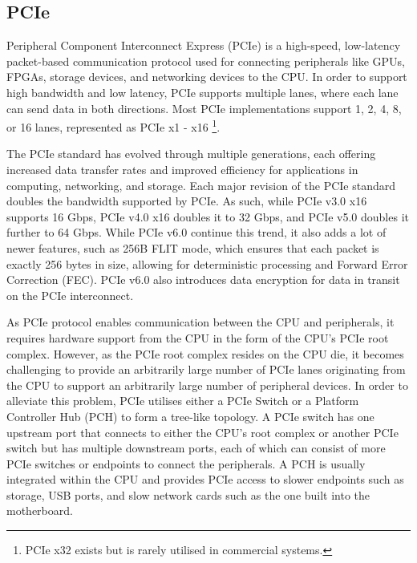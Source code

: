 \subsection{PCIe}
\label{subsec:interconnect-sc-background-pcie}

Peripheral Component Interconnect Express (PCIe) is a high-speed, low-latency packet-based communication protocol used for connecting peripherals like GPUs, FPGAs, storage devices, and networking devices to the CPU. 
In order to support high bandwidth and low latency, PCIe supports multiple lanes, where each lane can send data in both directions.
Most PCIe implementations support 1, 2, 4, 8, or 16 lanes, represented as PCIe x1 - x16
\footnote{PCIe x32 exists but is rarely utilised in commercial systems.}.

The PCIe standard has evolved through multiple generations, each offering increased data transfer rates and improved efficiency for applications in computing, networking, and storage.
Each major revision of the PCIe standard doubles the bandwidth supported by PCIe.
As such, while PCIe v3.0 x16 supports 16 Gbps, PCIe v4.0 x16 doubles it to 32 Gbps, and PCIe v5.0 doubles it further to 64 Gbps.
While PCIe v6.0 continue this trend, it also adds a lot of newer features, such as 256B FLIT mode, which ensures that each packet is exactly 256 bytes in size, allowing for deterministic processing and Forward Error Correction (FEC).
PCIe v6.0 also introduces data encryption for data in transit on the PCIe interconnect.

As PCIe protocol enables communication between the CPU and peripherals, it requires hardware support from the CPU in the form of the CPU's PCIe root complex.
However, as the PCIe root complex resides on the CPU die, it becomes challenging to provide an arbitrarily large number of PCIe lanes originating from the CPU to support an arbitrarily large number of peripheral devices.
In order to alleviate this problem, PCIe utilises either a PCIe Switch or a Platform Controller Hub (PCH) to form a tree-like topology.
A PCIe switch has one upstream port that connects to either the CPU's root complex or another PCIe switch but has multiple downstream ports, each of which can consist of more PCIe switches or endpoints to connect the peripherals.
A PCH is usually integrated within the CPU and provides PCIe access to slower endpoints such as storage, USB ports, and slow network cards such as the one built into the motherboard.

